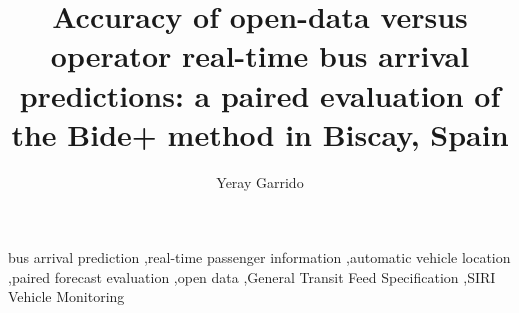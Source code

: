 \documentclass[preprint,11pt,authoryear]{elsarticle}
\begin{document}
\begin{frontmatter}

\title{Accuracy of open-data versus operator real-time bus arrival predictions: a paired evaluation of the Bide+ method
in Biscay, Spain}

\author[1]{Yeray Garrido}

% 

\begin{abstract}

\end{abstract}

\begin{keyword}
bus arrival prediction \sep real-time passenger information \sep automatic vehicle location \sep paired forecast
evaluation \sep open data \sep General Transit Feed Specification \sep SIRI Vehicle Monitoring
\end{keyword}

\end{frontmatter}









\clearpage


\end{document}
